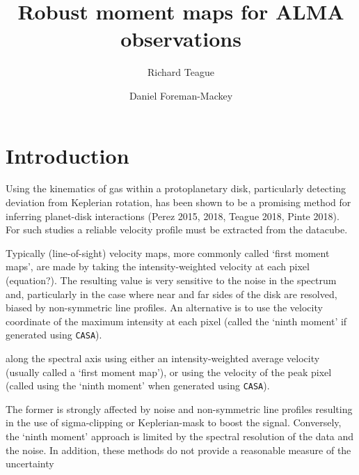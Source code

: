 \documentclass[rnaas]{aastex62}
\begin{document}
\raggedbottom\sloppy\sloppypar\frenchspacing

\title{%
Robust moment maps for ALMA observations
}

\author[0000-0003-1534-5186]{Richard Teague}

\author[0000-0002-9328-5652]{Daniel Foreman-Mackey}


\section{Introduction}


Using the kinematics of gas within a protoplanetary disk, particularly detecting deviation from Keplerian rotation, has been shown to be a promising method for inferring planet-disk interactions (Perez 2015, 2018, Teague 2018, Pinte 2018). For such studies a reliable velocity profile must be extracted from the datacube.

Typically (line-of-sight) velocity maps, more commonly called `first moment maps', are made by taking the intensity-weighted velocity at each pixel (equation?). The resulting value is very sensitive to the noise in the spectrum and, particularly in the case where near and far sides of the disk are resolved, biased by non-symmetric line profiles. An alternative is to use the velocity coordinate of the maximum intensity at each pixel (called the `ninth moment' if generated using \texttt{CASA}).

 along the spectral axis using either an intensity-weighted average velocity (usually called a `first moment map'), or using the velocity of the peak pixel (called using the `ninth moment' when generated using \texttt{CASA}).

The former is strongly affected by noise and non-symmetric line profiles resulting in the use of sigma-clipping or Keplerian-mask to boost the signal. Conversely, the `ninth moment' approach is limited by the spectral resolution of the data and the noise. In addition, these methods do not provide a reasonable measure of the uncertainty
\end{document}
